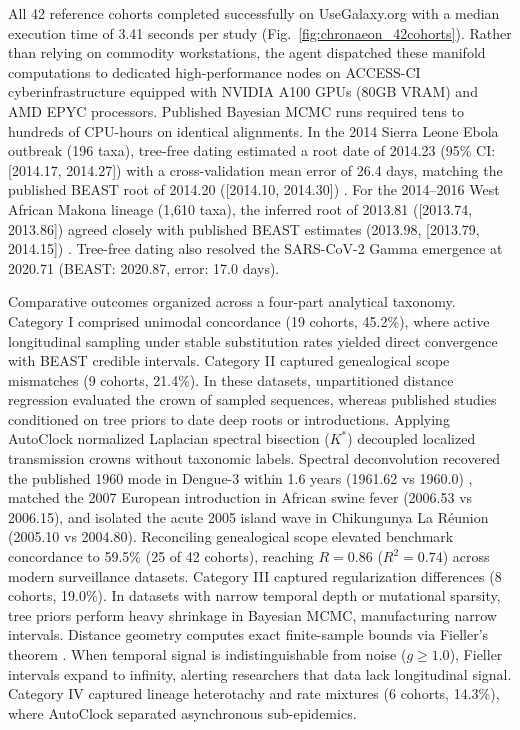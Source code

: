 \documentclass[11pt,letterpaper]{article}
\begin{document}
All 42 reference cohorts completed successfully on UseGalaxy.org with a median execution time of 3.41 seconds per study (Fig.~\ref{fig:chronaeon_42cohorts}). Rather than relying on commodity workstations, the agent dispatched these manifold computations to dedicated high-performance nodes on ACCESS-CI cyberinfrastructure equipped with NVIDIA A100 GPUs (80GB VRAM) and AMD EPYC processors. Published Bayesian MCMC runs required tens to hundreds of CPU-hours on identical alignments. In the 2014 Sierra Leone Ebola outbreak (196 taxa), tree-free dating estimated a root date of 2014.23 (95\% CI: [2014.17, 2014.27]) with a cross-validation mean error of 26.4 days, matching the published BEAST root of 2014.20 ([2014.10, 2014.30]) \cite{gire2014genomic}. For the 2014--2016 West African Makona lineage (1,610 taxa), the inferred root of 2013.81 ([2013.74, 2013.86]) agreed closely with published BEAST estimates (2013.98, [2013.79, 2014.15]) \cite{dudas2017virus}. Tree-free dating also resolved the SARS-CoV-2 Gamma emergence at 2020.71 (BEAST: 2020.87, error: 17.0 days).

Comparative outcomes organized across a four-part analytical taxonomy. Category I comprised unimodal concordance (19 cohorts, 45.2\%), where active longitudinal sampling under stable substitution rates yielded direct convergence with BEAST credible intervals. Category II captured genealogical scope mismatches (9 cohorts, 21.4\%). In these datasets, unpartitioned distance regression evaluated the crown of sampled sequences, whereas published studies conditioned on tree priors to date deep roots or introductions. Applying AutoClock normalized Laplacian spectral bisection ($K^*$) decoupled localized transmission crowns without taxonomic labels. Spectral deconvolution recovered the published 1960 mode in Dengue-3 within 1.6 years (1961.62 vs 1960.0) \cite{taylorsalmon2024travel}, matched the 2007 European introduction in African swine fever (2006.53 vs 2006.15), and isolated the acute 2005 island wave in Chikungunya La R{\'e}union (2005.10 vs 2004.80). Reconciling genealogical scope elevated benchmark concordance to 59.5\% (25 of 42 cohorts), reaching $R = 0.86$ ($R^2 = 0.74$) across modern surveillance datasets. Category III captured regularization differences (8 cohorts, 19.0\%). In datasets with narrow temporal depth or mutational sparsity, tree priors perform heavy shrinkage in Bayesian MCMC, manufacturing narrow intervals. Distance geometry computes exact finite-sample bounds via Fieller's theorem \cite{fieller1954some}. When temporal signal is indistinguishable from noise ($g \ge 1.0$), Fieller intervals expand to infinity, alerting researchers that data lack longitudinal signal. Category IV captured lineage heterotachy and rate mixtures (6 cohorts, 14.3\%), where AutoClock separated asynchronous sub-epidemics.
\end{document}
